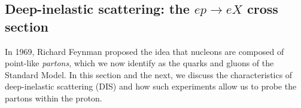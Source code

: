 

\subsection{Deep-inelastic scattering: the $ep\rightarrow eX$ cross section}
\label{sec.bkg_dis_dsigma}
In 1969, Richard Feynman proposed the idea that nucleons are composed of point-like {\it partons}, which we now identify as the quarks and gluons of the Standard Model.
In this section and the next, we discuss the characteristics of deep-inelastic scattering (DIS) and how such experiments allow us to probe the partons within the proton. 

